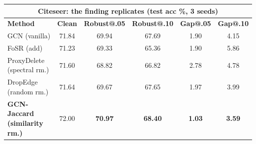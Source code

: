 \documentclass[border=14pt]{standalone}
\begin{document}
\small
\begin{tabular}{@{}lccccc@{}}
\multicolumn{6}{c}{\normalsize\textbf{Citeseer: the finding replicates (test acc \%, 3 seeds)}}\\[5pt]
\toprule
\textbf{Method} & \textbf{Clean} & \textbf{Robust@.05} & \textbf{Robust@.10} & \textbf{Gap@.05} & \textbf{Gap@.10}\\
\midrule
GCN (vanilla)        & 71.84 & 69.94 & 67.69 & 1.90 & 4.15\\
FoSR (add)           & 71.23 & 69.33 & 65.36 & 1.90 & 5.86\\
ProxyDelete (spectral rm.) & 71.60 & 68.82 & 66.82 & 2.78 & 4.78\\
DropEdge (random rm.) & 71.64 & 69.67 & 67.65 & 1.97 & 3.99\\
\midrule
\textbf{GCN-Jaccard (similarity rm.)} & 72.00 & \textbf{70.97} & \textbf{68.40} & \textbf{1.03} & \textbf{3.59}\\
\bottomrule
\end{tabular}
\end{document}
